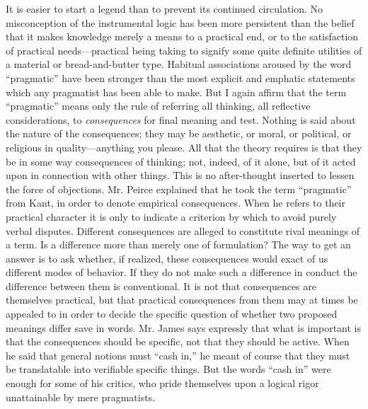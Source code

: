 \documentclass[12pt]{article}
\begin{document}
It is easier to start a legend than to prevent its
continued circulation. No misconception of the
instrumental logic has been more persistent than the
belief that it makes knowledge merely a means to a
practical end, or to the satisfaction of practical needs---practical
being taking to signify some quite definite
utilities of a material or bread-and-butter type.
Habitual associations aroused by the word ``pragmatic''
have been stronger than the most explicit
and emphatic statements which any pragmatist has
been able to make. But I again affirm that the
term ``pragmatic'' means only the rule of referring all
thinking, all reflective considerations, to \emph{consequences}
for final meaning and test. Nothing is said about
the nature of the consequences; they may be aesthetic,
or moral, or political, or religious in quality---anything
you please. All that the theory requires is that they
be in some way consequences of thinking; not, indeed,
of it alone, but of it acted upon in connection with
other things. This is no after-thought inserted to
lessen the force of objections. Mr. Peirce explained
that he took the term ``pragmatic'' from Kant, in
order to denote empirical consequences. When he
refers to their practical character it is only to indicate
a criterion by which to avoid purely verbal disputes.
Different consequences are alleged to constitute rival
meanings of a term. Is a difference more than
merely one of formulation? The way to get an answer
is to ask whether, if realized, these consequences would
exact of us different modes of behavior. If they do
not make such a difference in conduct the difference
between them is conventional. It is not that consequences
are themselves practical, but that practical
consequences from them may at times be appealed to
in order to decide the specific question of whether
two proposed meanings differ save in words. Mr.
James says expressly that what is important is that
the consequences should be specific, not that they
should be active. When he said that general notions
must ``cash in,'' he meant of course that they must
be translatable into verifiable specific things. But
the words ``cash in'' were enough for some of his
critics, who pride themselves upon a logical rigor
unattainable by mere pragmatists.
\end{document}
